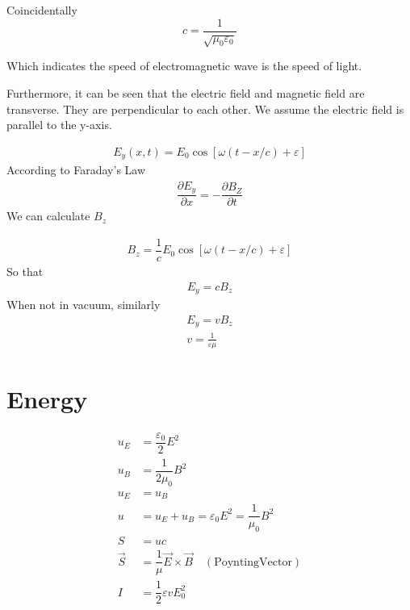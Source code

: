 Coincidentally
\begin{equation*}
  c = \dfrac{1}{\sqrt{\mu_{0} \varepsilon_{0}}} 
\end{equation*}

Which indicates the speed of electromagnetic wave is the speed of light.

Furthermore, it can be seen that the electric field and magnetic field are transverse. They are perpendicular to each other. We assume the electric field is parallel to the y-axis.

\begin{equation*}
  \begin{aligned}
    E_{y} (x,t) = E_{0} \cos \left[ \omega \left( t - x/c  \right) + \varepsilon \right]
  \end{aligned}
\end{equation*}
According to Faraday's Law
\begin{equation*}
  \begin{aligned}
    \dfrac{\partial E_{y}}{\partial x} = - \dfrac{\partial B_{Z}}{\partial t}  
  \end{aligned}
\end{equation*}
We can calculate $B_{z}$

\begin{equation*}
  \begin{aligned}
    B_z = \dfrac{1}{c} E_{0} \cos \left[ \omega \left( t - x/c  \right) + \varepsilon \right]
  \end{aligned}
\end{equation*}
So that
\begin{equation*}
  \begin{aligned}
    E_y = c B_z
  \end{aligned}
\end{equation*}
When not in vacuum, similarly
\begin{equation*}
  \begin{aligned}
    E_y=vB_z \\
    v=\frac{1}{\varepsilon\mu}
  \end{aligned}
\end{equation*}

\section{Energy}

\begin{equation*}
  \begin{aligned}
    u_{E} &= \dfrac{\varepsilon_{0}}{2} E^{2} \\
    u_{B} &= \dfrac{1}{2\mu_{0}} B^{2} \\
    u_{E} &= u_{B} \\
    u &= u_{E} + u_{B} = \varepsilon_{0} E^{2} = \dfrac{1}{\mu_{0}} B^{2} \\ 
    S &= uc \\
    \vec{S} &= \dfrac{1}{\mu} \vec{E} \times \vec{B} \quad \mathrm{(Poynting Vector)}\\
    I &= \dfrac{1}{2} \varepsilon v E_0^2
  \end{aligned}
\end{equation*}

